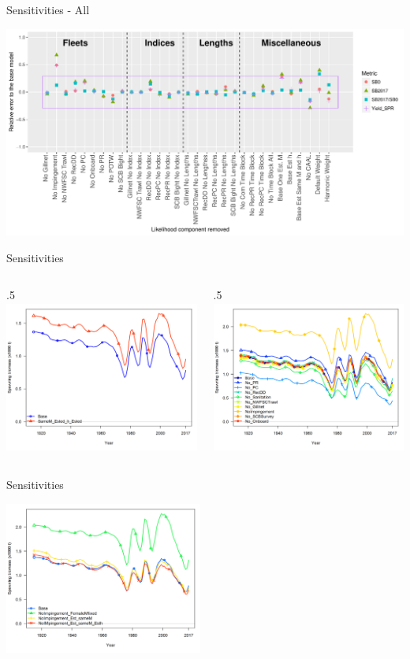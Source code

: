 \documentclass[ignorenonframetext,]{beamer}
\def\begincols{\begin{columns}}
\def\begincol{\begin{column}}
\def\endcol{\end{column}}
\def\endcols{\end{columns}}
\begin{document}
\begin{frame}{Sensitivities - All}

\includegraphics{Figures/Sensitivity_Yield.pdf}

\end{frame}

\begin{frame}{Sensitivities}

\begincols
 \begincol{.5\textwidth}
\includegraphics[height=5cm]{Figures/sensitivity_spawnbio.png} \endcol
 \begincol{.5\textwidth}
\includegraphics[height=5cm]{Figures/sensitivity1_spawnbio.png}\\
\endcol
\endcols

\end{frame}

\begin{frame}{Sensitivities}

\includegraphics[height=5cm]{Figures/sensitivity2_spawnbio.png}

\end{frame}
\end{document}
